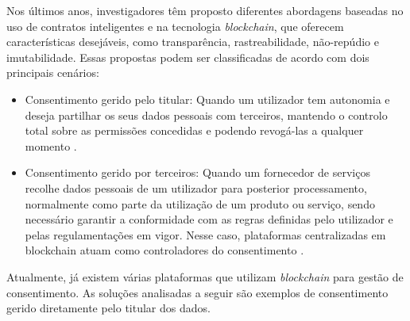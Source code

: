 Nos últimos anos, investigadores têm proposto diferentes abordagens baseadas no uso de contratos inteligentes e na tecnologia \textit{blockchain}, que oferecem características desejáveis, como transparência, rastreabilidade, não-repúdio e imutabilidade. Essas propostas podem ser classificadas de acordo com dois principais cenários:

\begin{itemize}
    \item Consentimento gerido pelo titular: Quando um utilizador tem autonomia e deseja partilhar os seus dados pessoais com terceiros, mantendo o controlo total sobre as permissões concedidas e podendo revogá-las a qualquer momento \citep{Merlec2021}.
    \item Consentimento gerido por terceiros: Quando um fornecedor de serviços recolhe dados pessoais de um utilizador para posterior processamento, normalmente como parte da utilização de um produto ou serviço, sendo necessário garantir a conformidade com as regras definidas pelo utilizador e pelas regulamentações em vigor. Nesse caso, plataformas centralizadas em blockchain atuam como controladores do consentimento \citep{Aldred2019}.
\end{itemize}

Atualmente, já existem várias plataformas que utilizam \textit{blockchain} para gestão de consentimento. 
As soluções analisadas a seguir são exemplos de consentimento gerido diretamente pelo titular dos dados.


